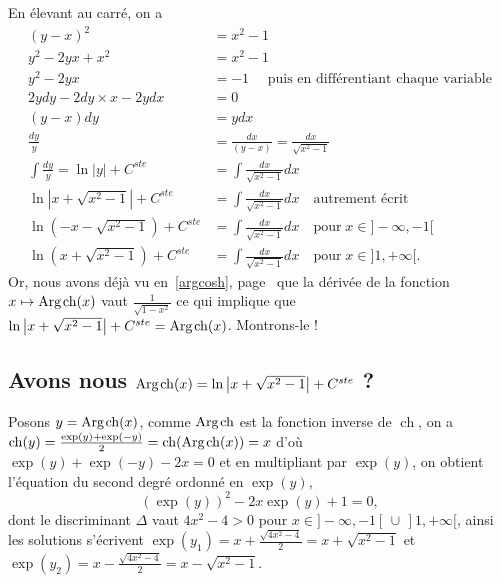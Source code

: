 \documentclass[a4paper,landscape,17pt]{extreport} %
\renewcommand{\cosh}{\mathop{\mathrm{ch}}}
\renewcommand{\arg}{\mathop{\mathrm{Arg}}}
\begin{document}
En élevant au carré, on a 
\begin{align*}
(y-x)^2 & = x^2 - 1 \\
y^2 - 2yx + x^2 & = x^2 - 1 \\
y^2 - 2yx  & = -1 \quad \textrm{ puis en différentiant chaque variable} \\
2ydy - 2dy \times x - 2ydx & = 0 \\
(y-x)dy & = ydx \\
\frac{dy}{y} & = \frac{dx}{(y-x)} = \frac{dx}{\sqrt{x^2-1} } \\
\int \frac{dy}{y} = \ln|y| + C^{ste} & = \int \frac{dx}{\sqrt{x^2-1} } dx \\
\ln\left|x + \sqrt{x^2-1}\right| + C^{ste} & = \int \frac{dx}{\sqrt{x^2-1} } dx  \quad \textrm{autrement écrit}\\ 
\ln(-x - \sqrt{x^2-1}) + C^{ste} & = \int \frac{dx}{\sqrt{x^2-1} } dx  \quad \textrm{pour} \;  x \in ]-\infty,-1[ \\
\ln(x + \sqrt{x^2-1}) + C^{ste} & = \int \frac{dx}{\sqrt{x^2-1} } dx  \quad \textrm{pour} \; x \in ]1,+\infty[ .
\end{align*}
Or, nous avons déjà vu en~\ref{argcosh}, page~\pageref{argcosh} que la dérivée de la fonction  $x \mapsto \arg\mspace{-1mu}\cosh(x)$  vaut $ \frac{1}{ \sqrt{1-x^2}}$ ce qui implique que $\ln\left|x + \sqrt{x^2-1}\right| + C^{ste} = \arg\mspace{-1mu}\cosh\nolimits(x) $. Montrons-le !

\subsection{Avons nous $\arg\mspace{-1mu}\cosh\nolimits(x) = \ln\left|x + \sqrt{x^2-1}\right| + C^{ste} $ ?}

Posons $ y = \arg\mspace{-1mu}\cosh\nolimits(x) $, comme $ \arg\mspace{-1mu}\cosh\nolimits $ est la fonction inverse de $\cosh$, on a $\cosh(y) = \frac{\exp(y) + \exp(-y)}{2} = \cosh(\arg\mspace{-1mu}\cosh\nolimits(x)) = x $ d'où $ \exp(y) + \exp(-y) -2x = 0 $ et en multipliant par $\exp(y)$, on obtient l'équation du second degré ordonné en $\exp(y)$,
\begin{equation}
\label{equa01}
\left(\exp(y) \right)^2 - 2x \exp(y) +1 = 0, 
\end{equation}
dont le discriminant $\Delta$ vaut $4x^2 - 4 > 0$ pour $ x \in ]-\infty,-1[ \, \cup \, ]1,+\infty[ $, ainsi les solutions s'écrivent $ \exp(y_1) = x + \frac{\sqrt{4x^2 - 4}}{2} = x + \sqrt{x^2-1}$ et $ \exp(y_2) = x - \frac{\sqrt{4x^2 - 4}}{2} = x - \sqrt{x^2-1}$. 
\end{document}
